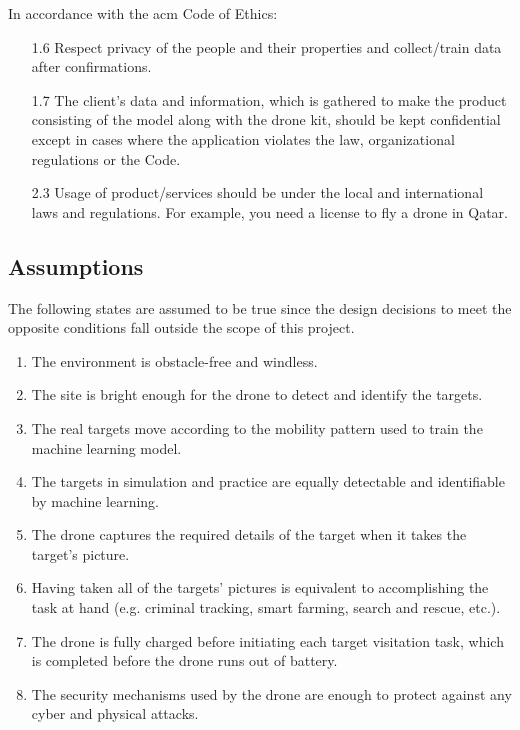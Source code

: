 \documentclass[../main.tex]{subfiles}
\begin{document}
\noindent
In accordance with the \gls{acm} Code of Ethics:
\begin{itemize}
    \item[1.6] Respect privacy of the people and their 
        properties and collect/train data after confirmations.
    \item[1.7] The client's data and information, which is gathered 
        to make the product consisting of the model along with 
        the drone kit, should be kept confidential except in cases 
        where the application violates the law, 
        organizational regulations or the Code.
    \item[2.3] Usage of product/services should be under 
        the local and international laws and regulations. 
        For example, you need a license to fly a drone in Qatar.
\end{itemize}

\subsection{Assumptions}

The following states are assumed to be true
since the design decisions to meet the opposite
conditions fall outside the scope of this project.

\begin{enumerate}
    \item The environment is obstacle-free and windless.
    \item The site is bright enough for the drone to
        detect and identify the targets.
    \item The real targets move according to the mobility 
        pattern used to train the machine learning model.
    \item The targets in simulation and practice are 
        equally detectable and identifiable by
        machine learning.
    \item The \anafi drone captures the 
        required details of the target 
        when it takes the target’s picture.
    \item Having taken all of the targets' pictures 
        is equivalent to accomplishing the task at hand 
        (e.g. criminal tracking, smart farming, 
        search and rescue, etc.).
    \item The \anafi drone is fully charged before 
        initiating each target visitation task,
        which is completed before the drone
        runs out of battery.
    \item The security mechanisms used by the \anafi
        drone are enough to protect against
        any cyber and physical attacks.
\end{enumerate}
\end{document}
